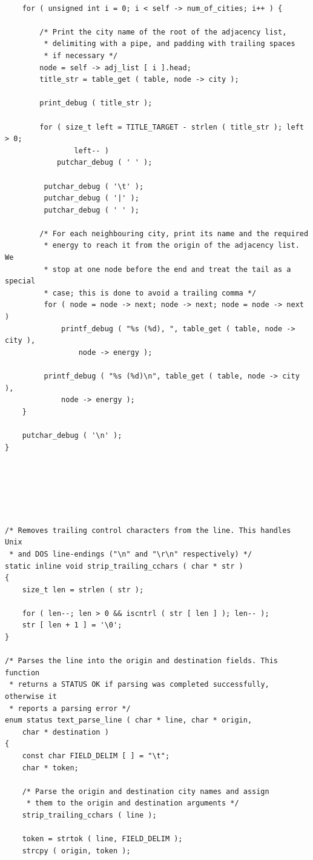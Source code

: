 \documentclass[11pt]{article}
\begin{document}
\begin{verbatim}
    
    for ( unsigned int i = 0; i < self -> num_of_cities; i++ ) {

        /* Print the city name of the root of the adjacency list,
         * delimiting with a pipe, and padding with trailing spaces
         * if necessary */
        node = self -> adj_list [ i ].head;
        title_str = table_get ( table, node -> city );

        print_debug ( title_str );

        for ( size_t left = TITLE_TARGET - strlen ( title_str ); left > 0;
                left-- )
            putchar_debug ( ' ' );

         putchar_debug ( '\t' );
         putchar_debug ( '|' );
         putchar_debug ( ' ' );

        /* For each neighbouring city, print its name and the required
         * energy to reach it from the origin of the adjacency list. We
         * stop at one node before the end and treat the tail as a special
         * case; this is done to avoid a trailing comma */
         for ( node = node -> next; node -> next; node = node -> next )
             printf_debug ( "%s (%d), ", table_get ( table, node -> city ),
                 node -> energy );

         printf_debug ( "%s (%d)\n", table_get ( table, node -> city ),
             node -> energy );
    }

    putchar_debug ( '\n' );
}






/* Removes trailing control characters from the line. This handles Unix
 * and DOS line-endings ("\n" and "\r\n" respectively) */
static inline void strip_trailing_cchars ( char * str )
{
    size_t len = strlen ( str );

    for ( len--; len > 0 && iscntrl ( str [ len ] ); len-- );
    str [ len + 1 ] = '\0';
}

/* Parses the line into the origin and destination fields. This function
 * returns a STATUS OK if parsing was completed successfully, otherwise it
 * reports a parsing error */
enum status text_parse_line ( char * line, char * origin,
    char * destination )
{
    const char FIELD_DELIM [ ] = "\t";
    char * token;

    /* Parse the origin and destination city names and assign
     * them to the origin and destination arguments */
    strip_trailing_cchars ( line );

    token = strtok ( line, FIELD_DELIM );
    strcpy ( origin, token );


\end{verbatim}
\end{document}

